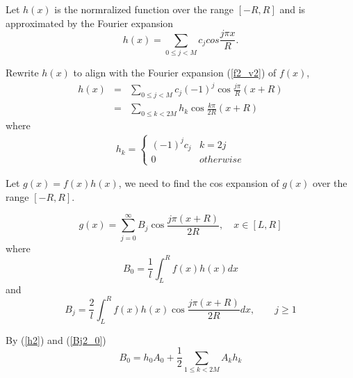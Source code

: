 \documentclass[numreferences]{kluwer}    %
\begin{document}
\begin{article}
Let $h(x)$ is the normralized function over the range $[-R,R]$ and is approximated by the Fourier expansion
\begin{equation}\label{h}
	h(x) =\sum_{0\le j < M}c_j cos\frac{j\pi x}{R}.
\end{equation}

Rewrite $h(x)$ to align with the Fourier expansion (\ref{f2_v2}) of $f(x)$,
\begin{eqnarray}
	h(x)&=& \sum_{0\le j<M}c_{j} (-1)^j\cos \frac{j\pi}{R}(x+R)\nonumber\\
	&=&  \sum_{0\le k<2M}h_k \cos \frac{k\pi}{2R}(x+R)\label{h2}
\end{eqnarray}
where
\begin{eqnarray}\label{v}
	h_k = \left\{\begin{array}{cc}
		(-1)^j c_j &  k=2j\\
		0 & otherwise 
	\end{array}
\end{eqnarray}

Let $g(x)=f(x)h(x)$,  we need to find the cos expansion of $g(x)$ over the range $[-R,R]$.  

\begin{equation}\label{g}
	g(x)=  \sum_{j=0}^{\infty}B_j \cos\frac{j\pi(x+R)}{2R},
	\quad x\in [L,R]
\end{equation}
where
\begin{equation}\label{Bj2_0}
	B_0=\frac{1}l\int^{R}_L f(x)h(x) dx
\end{equation}
and 
\begin{equation}\label{Bj2_j}
	B_j=\frac{2}l\int^{R}_L f(x)h(x)\cos\frac{j\pi(x+R)}{2R} dx, \qquad j\ge 1
\end{equation}

By (\ref{h2}) and (\ref{Bj2_0})
\begin{equation}
	B_0 = h_0A_0 + \frac12\sum_{1\le k <2M}A_kh_k 
\end{equation}


\end{article}
\end{document}
